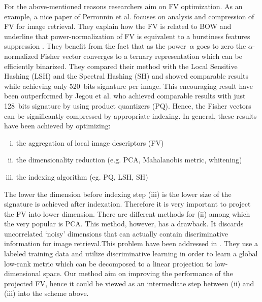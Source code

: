 \documentclass[table]{article} %
\begin{document}
 	For the above-mentioned reasons researchers aim on FV optimization. As an example, a nice paper of Perronnin et al. \cite{Perronnin2010} focuses on analysis and compression of FV for image retrieval. They explain how the FV is related to BOW and underline that power-normalization of FV is equivalent to a burstiness features suppression \cite{Jegou2009}. They benefit from the fact that as the power~$\alpha$ goes to zero the {$\alpha$-normalized} Fisher vector converges to a ternary representation which can be efficiently binarized. They compared their method with the Local Sensitive Hashing (LSH) and the Spectral Hashing (SH) and showed comparable results while achieving only 520~bits signature per image. This encouraging result have been outperformed by Jegou et al. \cite{Jegou2011} who achieved comparable results with just 128~bits signature by using product quantizers (PQ). Hence, the Fisher vectors can be significantly compressed by appropriate indexing. In general, these results have been achieved by optimizing:
 	
 	\begin{enumerate}[(i)]
 		\item the aggregation of local image descriptors (FV)
 		\item the dimensionality reduction (e.g. PCA, Mahalanobis metric, whitening)
 		\item the indexing algorithm (eg. PQ, LSH, SH)
 	\end{enumerate}

 	The lower the dimension before indexing step (iii) is the lower size of the signature is achieved after indexation. Therefore it is very important to project the FV into lower dimension. There are different methods for (ii) among which the very popular is PCA. This method, however, has a drawback. It discards uncorrelated `noisy' dimensions that can actually contain discriminative information for image retrieval.This problem have been addressed in \cite{Simonyan2013}. They use a labeled training data and utilize discriminative learning in order to learn a global low-rank metric which can be decomposed to a linear projection to low-dimensional space. Our method aim on improving the performance of the projected FV, hence it could be viewed as an intermediate step between (ii) and (iii) into the scheme above.
\end{document}
